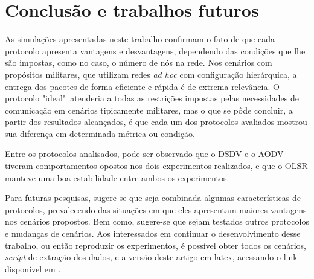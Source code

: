 \section{Conclus\~ao e trabalhos futuros}\label{conclusao}

As simula\c{c}\~oes apresentadas neste trabalho confirmam o fato de que cada protocolo apresenta vantagens e desvantagens, dependendo das condi\c{c}\~oes que lhe s\~ao impostas, como no caso, o n\'umero de n\'os na rede. 
Nos cen\'arios com prop\'ositos militares, que utilizam redes \textit{ad hoc} com configura\c{c}\~ao hier\'arquica, a entrega dos pacotes de forma eficiente e r\'apida \'e de extrema relev\^ancia. 
O protocolo "ideal"\ atenderia a todas as restri\c{c}\~oes impostas pelas necessidades de comunica\c{c}\~ao em cen\'arios tipicamente militares, mas o que se p\^ode concluir, a partir dos resultados alcan\c{c}ados, \'e que cada um dos protocolos avaliados mostrou sua diferen\c{c}a em determinada m\'etrica ou condi\c{c}\~ao.

Entre os protocolos analisados, pode ser observado que o DSDV e o AODV tiveram comportamentos opostos nos dois experimentos realizados, e que o OLSR manteve uma boa estabilidade entre ambos os experimentos.

Para futuras pesquisas, sugere-se que seja combinada algumas caracter\'isticas de protocolos, prevalecendo das situa\c{c}\~oes em que eles apresentam maiores vantagens nos cen\'arios propostos.
Bem como, sugere-se que sejam testados outros protocolos e mudan\c{c}as de cen\'arios.
Aos interessados em continuar o desenvolvimento desse trabalho, ou ent\~ao reproduzir os experimentos, \'e poss\'ivel obter todos os cen\'arios, \textit{script} de extra\c{c}\~ao dos dados, e a vers\~ao deste artigo em latex, acessando o link dispon\'ivel em \cite{fabiosammy}.
